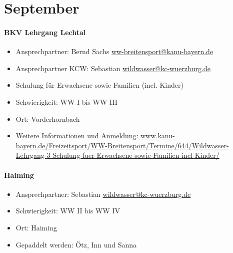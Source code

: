 \documentclass[12pt, a4paper]{report}
\begin{document}
\section*{September}\paragraph{BKV Lehrgang Lechtal}
\begin{itemize}
    \item Ansprechpartner: Bernd Sachs \href{mailto:ww-breitensport@kanu-bayern.de}{ww-breitensport@kanu-bayern.de}
    \item Ansprechpartner KCW: Sebastian \href{mailto:wildwasser@kc-wuerzburg.de}{wildwasser@kc-wuerzburg.de}
    \item Schulung für Erwachsene sowie Familien (incl. Kinder)
    \item Schwierigkeit: WW I bis WW III
    \item Ort: Vorderhornbach
    \item Weitere Informationen und Anmeldung: \url{www.kanu-bayern.de/Freizeitsport/WW-Breitensport/Termine/644/Wildwasser-Lehrgang-3-Schulung-fuer-Erwachsene-sowie-Familien-incl-Kinder/}
\end{itemize}

\paragraph{Haiming}
\begin{itemize}
    \item Ansprechpartner: Sebastian \href{mailto:wildwasser@kc-wuerzburg.de}{wildwasser@kc-wuerzburg.de}
    \item Schwierigkeit: WW II bis WW IV
    \item Ort: Haiming
    \item Gepaddelt werden: Ötz, Inn und Sanna
\end{itemize}
\end{document}
